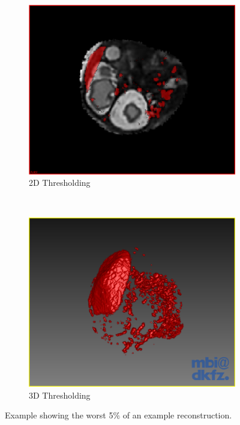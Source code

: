 \begin{figure}[h]
  \centering
  \begin{subfigure}[b]{0.5\textwidth}
    \includegraphics[width=\textwidth]{images/thresholding_2d.png}
    \caption{2D Thresholding}
    \label{fig:thresholding2d}
  \end{subfigure}%
  ~ %
  \begin{subfigure}[b]{0.5\textwidth}
    \includegraphics[width=\textwidth]{images/thresholding_3d.png}
    \caption{3D Thresholding}
    \label{fig:thresholding3d}
  \end{subfigure}
  \caption{Example showing the worst 5$\%$ of an example reconstruction.}\label{fig:threshldingoverview}
\end{figure}


